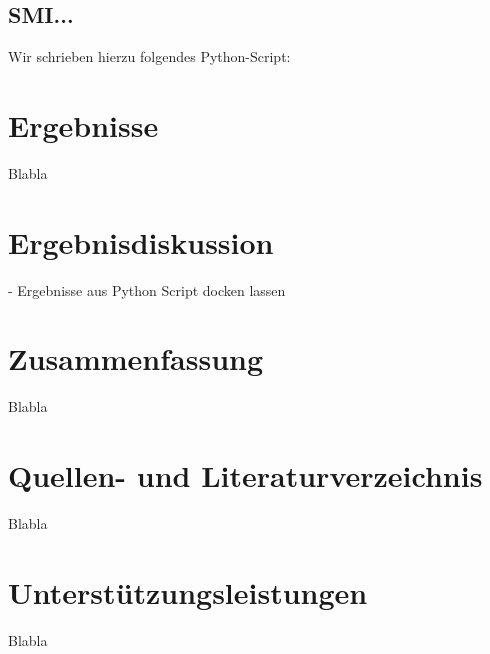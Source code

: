 \documentclass[11pt]{article}
\begin{document}
    \subsection{SMI...}\label{subsec:smi...}
    Wir schrieben hierzu folgendes Python-Script:

    


    \section{Ergebnisse}\label{sec:ergebnisse}

    Blabla


    \section{Ergebnisdiskussion}\label{sec:ergebnisdiskussion}

    - Ergebnisse aus Python Script docken lassen


    \section{Zusammenfassung}

    Blabla


    \section{Quellen- und Literaturverzeichnis}

    Blabla


    \section{Unterstützungsleistungen}

    Blabla
\end{document}
